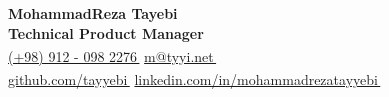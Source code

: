 \documentclass[11pt,a4paper]{article}
\let\orighref\href
\renewcommand{\href}[2]{\orighref{#1}{#2\,{\textsuperscript{\tiny{\textcolor{heritagered}{\faExternalLink}}}}}}
\begin{document}
\graphicspath{ {./img} }


    \textbf{\textcolor{ultramarine}{\Large MohammadReza Tayebi}}
    \\
    \textbf{Technical Product Manager}
    \\
    \small\href{tel:+989120982276}{(+98) 912 - 098 2276}
    \small\href{mailto:m@tyyi.net}{m@tyyi.net}
    \\
    \small\href{https://github.com/tayyebi}{github.com/tayyebi}
    \small\href{https://www.linkedin.com/in/mohammadrezatayyebi/}{linkedin.com/in/mohammadrezatayyebi}
    \vspace{-20pt}





\end{document}
